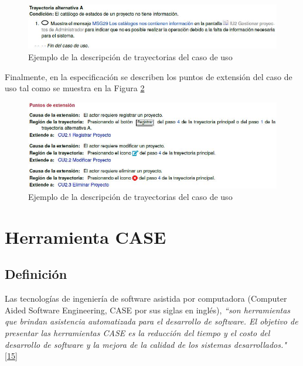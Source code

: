 \begin{figure}[H]
	\begin{center}
		\includegraphics[width=1\textwidth]{images/marcoteorico/alternativa}
		\caption{Ejemplo de la descripción de trayectorias del caso de uso}
		\label{fig:trayectoriap}
	\end{center}
\end{figure}

\newpage

Finalmente, en la especificación se describen los puntos de extensión del caso de uso tal como se muestra en la Figura \ref{fig:puntos}

\begin{figure}[H]
	\begin{center}
		\includegraphics[width=1\textwidth]{images/marcoteorico/puntosdeextension}
		\caption{Ejemplo de la descripción de trayectorias del caso de uso}
		\label{fig:puntos}
	\end{center}
\end{figure}

\newpage

\section{Herramienta CASE}

\subsection{Definición}

Las tecnologías de ingeniería de software asistida por computadora (Computer Aided Software Engineering, CASE por sus siglas en inglés), \textit {``son herramientas que brindan asistencia automatizada para el desarrollo de software. El objetivo de presentar las herramientas CASE es la reducción del tiempo y el costo del desarrollo de software y la mejora de la calidad de los sistemas desarrollados."} \hyperlink{b15}{[15]}\\

